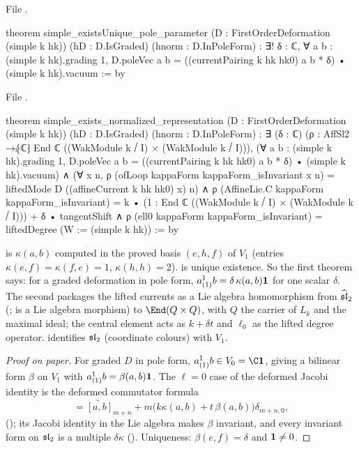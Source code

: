 \noindent File .
\begin{leancode}
theorem simple_existsUnique_pole_parameter (D : FirstOrderDeformation (simple k hk))
    (hD : D.IsGraded) (hnorm : D.InPoleForm) :
    ∃! δ : ℂ, ∀ a b : (simple k hk).grading 1,
      D.poleVec a b = ((currentPairing k hk hk0) a b * δ) • (simple k hk).vacuum := by
\end{leancode}
\noindent File .
\begin{leancode}
theorem simple_exists_normalized_representation (D : FirstOrderDeformation (simple k hk))
    (hD : D.IsGraded) (hnorm : D.InPoleForm) :
    ∃ (δ : ℂ) (ρ : AffSl2 →ₗ⁅ℂ⁆ End ℂ ((WakModule k ⧸ I) × (WakModule k ⧸ I))),
      (∀ a b : (simple k hk).grading 1, D.poleVec a b = ((currentPairing k hk hk0) a b * δ) • (simple k hk).vacuum) ∧
      (∀ x n, ρ (ofLoop kappaForm kappaForm_isInvariant x n) =
        liftedMode D ((affineCurrent k hk hk0) x) n) ∧
      ρ (AffineLie.C kappaForm kappaForm_isInvariant) =
        k • (1 : End ℂ ((WakModule k ⧸ I) × (WakModule k ⧸ I))) + δ • tangentShift ∧
      ρ (ell0 kappaForm kappaForm_isInvariant) = liftedDegree (W := (simple k hk)) := by
\end{leancode}

\begin{dictionary}
 is $\kappa(a,b)$ computed in the proved basis $(e,h,f)$ of $V_1$ (entries
$\kappa(e,f)=\kappa(f,e) = 1$, $\kappa(h,h)=2$).  is unique existence. So the first theorem says: for a
graded deformation in pole form, $a^1_{(1)}b = \delta\,\kappa(a,b)\mathbf{1}$ for one scalar $\delta$. The second
packages the lifted currents as a Lie algebra homomorphism  from $\widehat{\mathfrak{sl}}_2$
(;  is a Lie algebra morphism) to $\End(Q\times Q)$, with $Q$ the carrier of
$L_k$ and  the maximal ideal; the central element acts as $k + \delta t$ and $\ell_0$ as the lifted
degree operator.  identifies $\mathfrak{sl}_2$ (coordinate colours) with $V_1$.
\end{dictionary}

\begin{proof}[Proof on paper]
For graded $D$ in pole form, $a^1_{(1)}b\in V_0 = \C\lnineone$, giving a bilinear form $\beta$ on $V_1$
with $a^1_{(1)}b = \beta(a,b)\mathbf{1}$. The $\ell=0$ case of the deformed Jacobi identity is the deformed
commutator formula
\begin{equation*}
  [\tilde a_m, \tilde b_n] = \widetilde{[a,b]}_{m+n} + m\bigl(k\kappa(a,b) + t\,\beta(a,b)\bigr)\delta_{m+n,0},
\end{equation*}
(); its Jacobi identity in the Lie algebra makes $\beta$ invariant,
and every invariant form on $\mathfrak{sl}_2$ is a multiple $\delta\kappa$ ().
Uniqueness: $\beta(e,f) = \delta$ and $\mathbf{1}\neq0$.
\end{proof}

